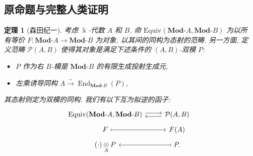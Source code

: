 \documentclass[11pt]{article}
\newcommand{\End}{\operatorname{End}}
\newcommand{\cated}[1]{\mathbf{#1}\text{-}}
\newcommand{\dotimes}[1]{\mathbin{\mathop{\otimes}\limits_{#1}}}
\newcommand{\rightiso}{\xrightarrow{\sim}}
\newcommand{\CorpusNumber}{0}
\newtheorem{theorem}{定理}
\theoremstyle{definition}
\begin{document}
\subsection*{原命题与完整人类证明}
\def\CorpusNumber{7.7.16}
\begin{theorem}[森田纪一]\label{prop:Morita-refined}
	考虑 $\Bbbk$-代数 $A$ 和 $B$. 命 $\mathrm{Equiv}(\cated{Mod}A, \cated{Mod}B)$ 为以所有等价 $F: \cated{Mod}A \to \cated{Mod}B$ 为对象, 以其间的同构为态射的范畴. 另一方面, 定义范畴 $\mathcal{P}(A, B)$ 使得其对象是满足下述条件的 $(A, B)$-双模 $P$:
	\begin{itemize}
		\item $P$ 作为右 $B$-模是 $\cated{Mod}B$ 的有限生成投射生成元,
		\item 左乘诱导同构 $A \rightiso \End_{\cated{Mod}B}(P)$,
	\end{itemize}
	其态射则定为双模的同构. 我们有以下互为拟逆的函子:
	\[\begin{tikzcd}[row sep=tiny]
		\mathrm{Equiv}(\cated{Mod}A, \cated{Mod}B) \arrow[shift left, r] & \mathcal{P}(A, B) \arrow[shift left, l] \\
		F \arrow[mapsto, r] & F(A) \\
		(\cdot) \dotimes{A} P & P \arrow[mapsto, l] .
	\end{tikzcd}\]
\end{theorem}
\end{document}
